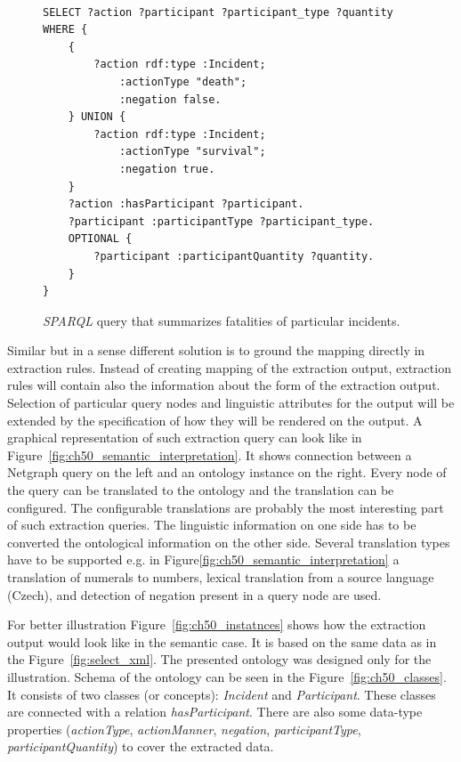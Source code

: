 \begin{figure}[ht]
\begin{verbatim}

SELECT ?action ?participant ?participant_type ?quantity
WHERE {
	{
		?action rdf:type :Incident;
			:actionType "death";
			:negation false.
	} UNION {
		?action rdf:type :Incident;
			:actionType "survival";
			:negation true.
	}
	?action :hasParticipant ?participant.
	?participant :participantType ?participant_type.
	OPTIONAL {
		?participant :participantQuantity ?quantity.
	}
}
\end{verbatim}
\caption{\emph{SPARQL} query that summarizes fatalities of particular incidents.}
\label{fig:sparql_aggregation}
\end{figure}



Similar but in a sense different solution is to ground the mapping directly in extraction rules. Instead of creating mapping of the extraction output, extraction rules will contain also the information about the form of the extraction output. Selection of particular query nodes and linguistic attributes for the output will be extended by the specification of how they will be rendered on the output. A graphical representation of such extraction query can look like in Figure~\ref{fig:ch50_semantic_interpretation}. It shows connection between a Netgraph query on the left and an ontology instance on the right. Every node of the query can be translated to the ontology and the translation can be configured. The configurable translations are probably the most interesting part of such extraction queries. The linguistic information on one side has to be converted the ontological information on the other side. Several translation types have to be supported e.g. in Figure\ref{fig:ch50_semantic_interpretation} a translation of numerals to numbers, lexical translation from a source language (Czech), and detection of negation present in a query node are used.

For better illustration Figure~\ref{fig:ch50_instatnces} shows how the extraction output would look like in the semantic case. It is based on the same data as in the Figure~\ref{fig:select_xml}. The presented ontology was designed only for the illustration. Schema of the ontology can be seen in the Figure~\ref{fig:ch50_classes}. It consists of two classes (or concepts): \emph{Incident} and \emph{Participant}. These classes are connected with a relation \emph{hasParticipant}. There are also some data-type properties (\emph{actionType}, \emph{actionManner}, \emph{negation}, \emph{participantType}, \emph{participantQuantity}) to cover the extracted data. 

